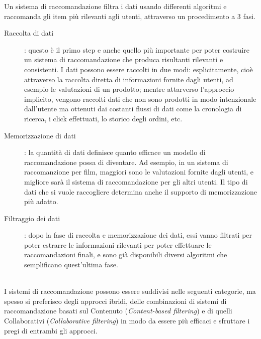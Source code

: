 Un sistema di raccomandazione filtra i dati usando differenti algoritmi e raccomanda gli item più rilevanti agli utenti, attraverso 
un procedimento a 3 fasi.
\begin{description}
	\item[Raccolta di dati]: questo è il primo step e anche quello più importante per poter costruire un sistema di 
	raccomandazione che produca risultanti rilevanti e consistenti. I dati possono essere raccolti in due modi: esplicitamente,
	cioè attraverso la raccolta diretta di informazioni fornite dagli utenti, ad esempio le valutazioni di un prodotto; mentre 
	attarverso l'approccio implicito, vengono raccolti dati che non sono prodotti in modo intenzionale dall'utente ma ottenuti
	dai costanti flussi di dati come la cronologia di ricerca, i click effettuati, lo storico degli ordini, etc.
	\item[Memorizzazione di dati]: la quantità di dati definisce quanto efficace un modello di raccomandazione possa di
	diventare. Ad esempio, in un sistema di raccomanzione per film, maggiori sono le valutazioni fornite dagli utenti, e 
	migliore sarà il sistema di raccomandazione per gli altri utenti. Il tipo di dati che si vuole raccogliere determina
	anche il supporto di memorizzazione più adatto.   
	\item[Filtraggio dei dati]: dopo la fase di raccolta e memorizzazione dei dati, essi vanno filtrati per poter estrarre
	le informazioni rilevanti per poter effettuare le raccomandazioni finali, e sono già disponibili diversi algoritmi che
	semplificano quest'ultima fase. 
\end{description}
\ \\
I sistemi di raccomandazione possono essere suddivisi nelle seguenti categorie, ma spesso si preferisco degli approcci ibridi, delle
combinazioni di sistemi di raccomandazione basati sul Contenuto (\textit{Content-based filtering}) e di
quelli Collaborativi (\textit{Collaborative filtering}) in modo da essere più efficaci e sfruttare i pregi di entrambi gli approcci.


